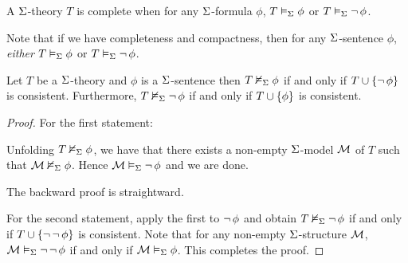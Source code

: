\begin{dfn}[Complete]
    A $\Sigma$-theory $T$ is complete when 
    for any $\Sigma$-formula $\phi$, 
    $T \vDash_{\Sigma} \phi$ or 
    $T \vDash_{\Sigma} \neg\, \phi$.
\end{dfn}
Note that if we have completeness and compactness,
then for any $\Sigma$-sentence $\phi$,
\emph{either} $T \vDash_{\Sigma} \phi$ or 
$T \vDash_{\Sigma} \neg\, \phi$.

\begin{prop}
    Let $T$ be a $\Sigma$-theory
    and $\phi$ is a $\Sigma$-sentence
    then $T \nvDash_{\Sigma} \phi$
    if and only if $T \cup \left\{ \neg\, \phi\right\}$ is consistent.
    Furthermore, $T \nvDash_{\Sigma} \neg\, \phi$
    if and only if $T \cup \left\{ \phi\right\}$ is consistent.
\end{prop}
\begin{proof}
    For the first statement:
    \begin{forward}
        Unfolding $T \nvDash_{\Sigma} \phi$,
        we have that there exists a non-empty $\Sigma$-model $\mathcal{M}$ of $T$ 
        such that $\mathcal{M} \nvDash_{\Sigma} \phi$.
        Hence $\mathcal{M} \vDash_{\Sigma} \neg\, \phi$ and we are done.
    \end{forward}
    The backward proof is straightward.

    For the second statement, 
    apply the first to $\neg\, \phi$ and obtain 
    $T \nvDash_{\Sigma} \neg\, \phi$
    if and only if $T \cup \left\{\neg\, \neg\, \phi\right\}$ is consistent.
    Note that for any non-empty $\Sigma$-structure $\mathcal{M}$, 
    $\mathcal{M} \vDash_{\Sigma} \neg\, \neg\, \phi$ 
    if and only if $\mathcal{M} \vDash_{\Sigma} \phi$.
    This completes the proof.
\end{proof}

